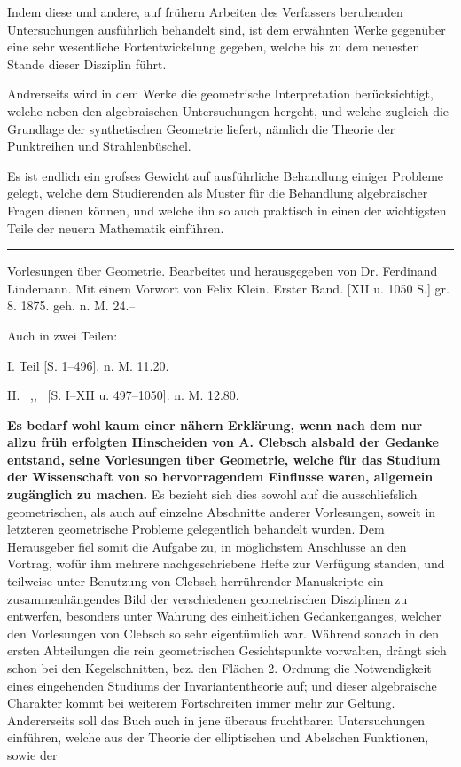 \documentclass[11pt]{article}
\begin{document}
Indem diese und andere, auf fr\"uhern Arbeiten des Verfassers beruhenden Untersuchungen ausf\"uhrlich behandelt sind, ist dem erw\"ahnten Werke gegen\"uber eine sehr wesentliche Fortentwickelung gegeben, welche bis zu dem neuesten Stande dieser Disziplin f\"uhrt.

Andrerseits wird in dem Werke die geometrische Interpretation ber\"ucksichtigt, welche neben den algebraischen Untersuchungen hergeht, und welche zugleich die Grundlage der synthetischen Geometrie liefert, n\"amlich die Theorie der Punktreihen und Strahlenb\"uschel.

Es ist endlich ein grofses Gewicht auf ausf\"uhrliche Behandlung einiger Probleme gelegt, welche dem Studierenden als Muster f\"ur die Behandlung algebraischer Fragen dienen k\"onnen, und welche ihn so auch praktisch in einen der wichtigsten Teile der neuern Mathematik einf\"uhren.

\rule{6em}{0.4pt} Vorlesungen \"uber Geometrie. Bearbeitet und herausgegeben von Dr. Ferdinand Lindemann. Mit einem Vorwort von Felix Klein. Erster Band. [XII u. 1050 S.] gr. 8. 1875. geh. \hfill n. M. 24.--

Auch in zwei Teilen:

I. Teil [S. 1--496]. n. M. 11.20.

II. \ ,, \ [S. I--XII u. 497--1050]. n. M. 12.80.

\textbf{Es bedarf wohl kaum einer n\"ahern Erkl\"arung, wenn nach dem nur allzu fr\"uh erfolgten Hinscheiden von A. Clebsch alsbald der Gedanke entstand, seine Vorlesungen \"uber Geometrie, welche f\"ur das Studium der Wissenschaft von so hervorragendem Einflusse waren, allgemein zug\"anglich zu machen.} Es bezieht sich dies sowohl auf die ausschliefslich geometrischen, als auch auf einzelne Abschnitte anderer Vorlesungen, soweit in letzteren geometrische Probleme gelegentlich behandelt wurden. Dem Herausgeber fiel somit die Aufgabe zu, in m\"oglichstem Anschlusse an den Vortrag, wof\"ur ihm mehrere nachgeschriebene Hefte zur Verf\"ugung standen, und teilweise unter Benutzung von Clebsch herr\"uhrender Manuskripte ein zusammenh\"angendes Bild der verschiedenen geometrischen Disziplinen zu entwerfen, besonders unter Wahrung des einheitlichen Gedankenganges, welcher den Vorlesungen von Clebsch so sehr eigent\"umlich war. W\"ahrend sonach in den ersten Abteilungen die rein geometrischen Gesichtspunkte vorwalten, dr\"angt sich schon bei den Kegelschnitten, bez. den Fl\"achen 2. Ordnung die Notwendigkeit eines eingehenden Studiums der Invariantentheorie auf; und dieser algebraische Charakter kommt bei weiterem Fortschreiten immer mehr zur Geltung. Andererseits soll das Buch auch in jene \"uberaus fruchtbaren Untersuchungen einf\"uhren, welche aus der Theorie der elliptischen und Abelschen Funktionen, sowie der
\end{document}
